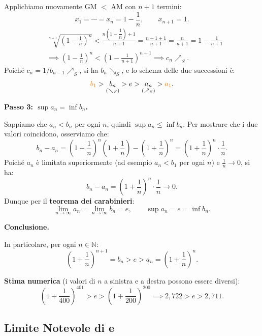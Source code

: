 {Applichiamo nuovamente GM $<$ AM con $n+1$ termini:
\[
x_1 = \cdots = x_n = 1-\frac{1}{n}, \qquad x_{n+1} = 1.
\]
\begin{align*}
&\sqrt[n+1]{\left(1-\frac{1}{n}\right)^n} 
  < \frac{n\!\left(1-\dfrac{1}{n}\right)+1}{n+1}
  = \frac{n-1+1}{n+1} = \frac{n}{n+1} = 1-\frac{1}{n+1} \\[6pt]
&\implies \left(1-\frac{1}{n}\right)^n < \left(1-\frac{1}{n+1}\right)^{n+1}
\implies c_n \nearrow_S.
\end{align*}
Poiché $c_n = 1/b_{n-1} \nearrow_S$, si ha $b_n \searrow_S$, 
e lo schema delle due successioni è:
\[
\textcolor{orange}{b_1} > \underset{(\searrow_S)}{b_n} > e 
> \underset{(\nearrow_S)}{a_n} > \textcolor{orange}{a_1}.
\]

\bigskip
\textbf{Passo 3: $\sup a_n = \inf b_n$.}

Sappiamo che $a_n < b_n$ per ogni $n$, quindi $\sup a_n \leq \inf b_n$. 
Per mostrare che i due valori coincidono, osserviamo che:
\[
b_n - a_n = \left(1+\frac{1}{n}\right)^n\left(1+\frac{1}{n}\right) 
          - \left(1+\frac{1}{n}\right)^n 
          = \left(1+\frac{1}{n}\right)^n \cdot \frac{1}{n}.
\]
Poiché $a_n$ è limitata superiormente (ad esempio $a_n < b_1$ per ogni $n$) 
e $\frac{1}{n} \to 0$, si ha:
\[
b_n - a_n = \left(1+\frac{1}{n}\right)^n \cdot \frac{1}{n} \to 0.
\]
Dunque per il \textbf{teorema dei carabinieri}:
\[
\lim_{n\to\infty} a_n = \lim_{n\to\infty} b_n = e,
\qquad \sup a_n = e = \inf b_n.
\]

\bigskip
\textbf{Conclusione.}

In particolare, per ogni $n \in \mathbb{N}$:
\[
\left(1+\frac{1}{n}\right)^{n+1} = b_n > e > a_n = \left(1+\frac{1}{n}\right)^n.
\]

\textbf{Stima numerica} (i valori di $n$ a sinistra e a destra possono essere diversi):
\[
\left(1+\frac{1}{400}\right)^{401} > e > \left(1+\frac{1}{200}\right)^{200}
\implies 2{,}722 > e > 2{,}711.
\]
}

\subsection{Limite Notevole di e}

